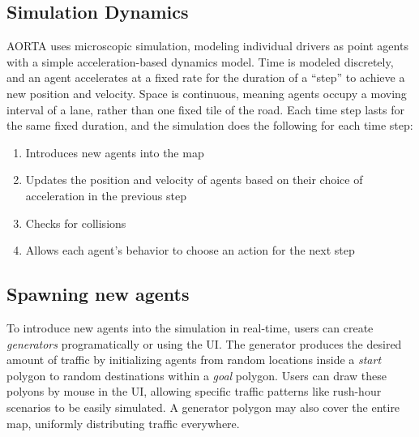 \documentclass[letterpaper, 10 pt, conference]{ieeeconf}  %
\begin{document}
\subsection{Simulation Dynamics} 

AORTA uses microscopic simulation, modeling individual drivers as point agents
with a simple acceleration-based dynamics model. Time is modeled discretely,
and an agent accelerates at a fixed rate for the duration of a ``step'' to
achieve a new position and velocity. Space is continuous, meaning agents occupy
a moving interval of a lane, rather than one fixed tile of the road. Each time
step lasts for the same fixed duration, and the simulation does the following
for each time step:

\begin{enumerate}
  \item Introduces new agents into the map
  \item Updates the position and velocity of agents based on their choice of
        acceleration in the previous step
  \item Checks for collisions
  \item Allows each agent's behavior to choose an action for the next step
\end{enumerate}

\subsection{Spawning new agents}

To introduce new agents into the simulation in real-time, users can create
\emph{generators} programatically or using the UI. The generator produces the
desired amount of traffic by initializing agents from random locations inside a
\textit{start} polygon to random destinations within a \textit{goal} polygon.
Users can draw these polyons by mouse in the UI, allowing specific traffic
patterns like rush-hour scenarios to be easily simulated. A generator polygon
may also cover the entire map, uniformly distributing traffic everywhere.
\end{document}
